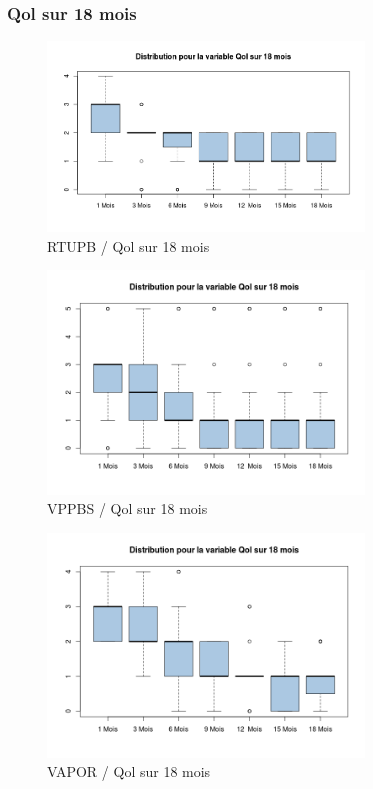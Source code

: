 %
%


\subsubsection{Qol sur 18 mois }

\begin{figure}[H]
\centering
\includegraphics[width=0.75\textwidth]{../Fig/RTUPB/rtupb-boxplot-post-Qol}
\caption{RTUPB / Qol sur 18 mois}
\end{figure}	
	
\begin{figure}[H]
\centering
\includegraphics[width=0.75\textwidth]{../Fig/VPPBS/vppbs-boxplot-post-Qol}
\caption{VPPBS / Qol sur 18 mois}
\end{figure}	
	
	
\begin{figure}[H]
\centering
\includegraphics[width=0.75\textwidth]{../Fig/VAPOR/vapor-boxplot-post-Qol}
\caption{VAPOR / Qol sur 18 mois}
\end{figure}	
	


%
